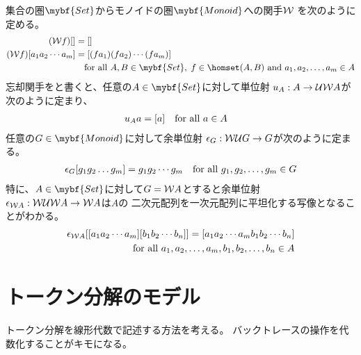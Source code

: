 	集合の圏$\mybf{Set}$からモノイドの圏$\mybf{Monoid}$への関手$\mathcal{W}{}$
	を次のように定める。
	\begin{equation*}\begin{split} %
		(\Word{f})\word{} &= \word{} \\
		(\Word{f})\word{a_1a_2\cdots a_m} &= \word{(fa_1)(fa_2)\cdots (fa_m)} \\
		&\quad\text{for all }A,B\in\mybf{Set},\;f\in\homset(A,B) \text{ and }
		a_1,a_2,\dots,a_m\in A \\
	\end{split}\end{equation*} %
	忘却関手を\Forget{}と書くと、任意の$A\in\mybf{Set}$に対して単位射
	$u_A:A\to \mathcal{U}{}\mathcal{W}{A}$が次のように定まり、
	\begin{equation*}\begin{split} %
		u_Aa &= \word{a} \quad\text{for all }a\in A
	\end{split}\end{equation*} %
	任意の$G\in\mybf{Monoid}$に対して余単位射
	$\epsilon_G:\mathcal{W}{}\mathcal{U}{}{G}\to G$が次のように定まる。
	\begin{equation*}\begin{split} %
		\epsilon_G\word{g_1g_2\dots g_m} = g_1g_2\cdots g_m
		\quad\text{for all }g_1,g_2,\dots,g_m\in G
	\end{split}\end{equation*} %
	特に、$A\in\mybf{Set}$に対して$G=\mathcal{W}{A}$とすると余単位射
	$\epsilon_{\mathcal{W}{A}}:\mathcal{W}{}\mathcal{U}{}\mathcal{W}{A}\to \mathcal{W}{A}$は$A$の
	二次元配列を一次元配列に平坦化する写像となることがわかる。
	\begin{equation*}\begin{split} %
		\epsilon_{\Word{A}}
		\word{\word{a_1a_2\cdots a_m}\word{b_1b_2\cdots b_n}}
		= \word{a_1a_2\cdots a_mb_1b_2\cdots b_n} \\
		\quad\text{for all }a_1,a_2,\dots,a_m,b_1,b_2,\dots,b_n\in A
	\end{split}\end{equation*} %
\section{トークン分解のモデル}\label{s1:トークン分解のモデル} %
	トークン分解を線形代数で記述する方法を考える。
	バックトレースの操作を代数化することがキモになる。

